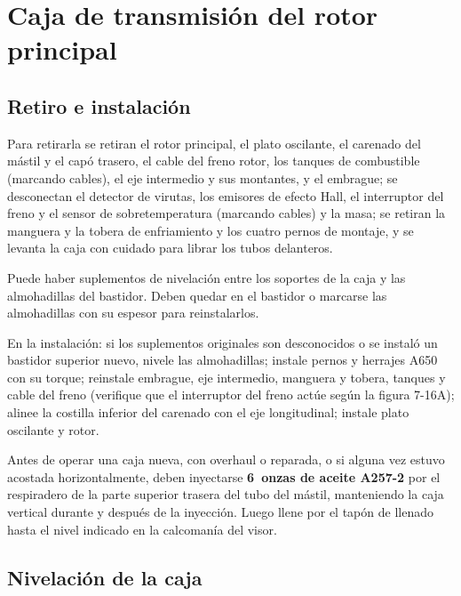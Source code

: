 \section{Caja de transmisión del rotor principal}

\subsection{Retiro e instalación}

Para retirarla se retiran el rotor principal, el plato oscilante, el carenado del mástil y el capó trasero, el cable del freno rotor, los tanques de combustible (marcando cables), el eje intermedio y sus montantes, y el embrague; se desconectan el detector de virutas, los emisores de efecto Hall, el interruptor del freno y el sensor de sobretemperatura (marcando cables) y la masa; se retiran la manguera y la tobera de enfriamiento y los cuatro pernos de montaje, y se levanta la caja con cuidado para librar los tubos delanteros.

\begin{advertencia}
Puede haber suplementos de nivelación entre los soportes de la caja y las almohadillas del bastidor. Deben quedar en el bastidor o marcarse las almohadillas con su espesor para reinstalarlos.
\end{advertencia}

En la instalación: si los suplementos originales son desconocidos o se instaló un bastidor superior nuevo, nivele las almohadillas; instale pernos y herrajes A650 con su torque; reinstale embrague, eje intermedio, manguera y tobera, tanques y cable del freno (verifique que el interruptor del freno actúe según la figura 7-16A); alinee la costilla inferior del carenado con el eje longitudinal; instale plato oscilante y rotor.

\begin{precaucion}
Antes de operar una caja nueva, con overhaul o reparada, o si alguna vez estuvo acostada horizontalmente, deben inyectarse \textbf{6~onzas de aceite A257-2} por el respiradero de la parte superior trasera del tubo del mástil, manteniendo la caja vertical durante y después de la inyección. Luego llene por el tapón de llenado hasta el nivel indicado en la calcomanía del visor.
\end{precaucion}

\subsection{Nivelación de la caja}

